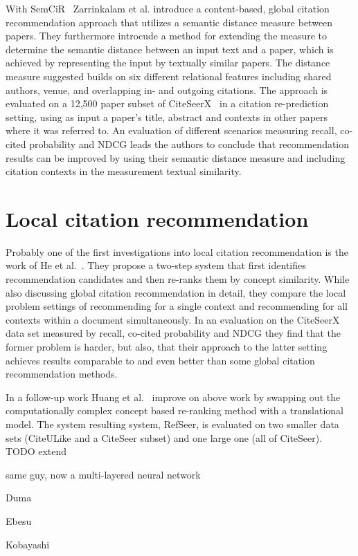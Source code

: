 With SemCiR~\cite{Zarrinkalam2013} Zarrinkalam et al. introduce a content-based, global citation recommendation approach that utilizes a semantic distance measure between papers. They furthermore introcude a method for extending the measure to determine the semantic distance between an input text and a paper, which is achieved by representing the input by textually similar papers. The distance measure suggested builds on six different relational features including shared authors, venue, and overlapping in- and outgoing citations. The approach is evaluated on a 12,500 paper subset of CiteSeerX~\cite{Caragea2014} in a citation re-prediction setting, using as input a paper's title, abstract and contexts in other papers where it was referred to. An evaluation of different scenarios measuring recall, co-cited probability and NDCG leads the authors to conclude that recommendation results can be improved by using their semantic distance measure and including citation contexts in the measurement textual similarity.





\section{Local citation recommendation}

Probably one of the first investigations into local citation recommendation is the work of He et al.~\cite{He2010}. They propose a two-step system that first identifies recommendation candidates and then re-ranks them by concept similarity. While also discussing global citation recommendation in detail, they compare the local problem settings of recommending for a single context and recommending for all contexts within a document simultaneously. In an evaluation on the CiteSeerX data set measured by recall, co-cited probability and NDCG they find that the former problem is harder, but also, that their approach to the latter setting achieves results comparable to and even better than some global citation recommendation methods.

In a follow-up work Huang et al.~\cite{Huang2014} improve on above work by swapping out the computationally complex concept based re-ranking method with a translational model. The system resulting system, RefSeer, is evaluated on two smaller data sets (CiteULike and a CiteSeer subset) and one large one (all of CiteSeer). TODO extend

same guy, now a multi-layered neural network~\cite{Huang2015}

Duma~\cite{Duma2014,Duma2016}

Ebesu~\cite{Ebesu2017}

Kobayashi~\cite{Kobayashi2018}
